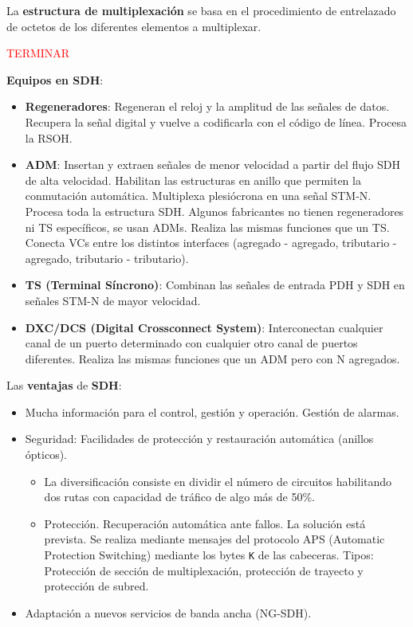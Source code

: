 \documentclass[10pt,portrait, twocolumn]{article}
\begin{document}
La \textbf{estructura de multiplexación} se basa en el procedimiento de entrelazado de octetos de los diferentes elementos a multiplexar.

\textcolor{red}{TERMINAR}

\textbf{Equipos en SDH}:

	\begin{itemize}
	\item \textbf{Regeneradores}: Regeneran el reloj y la amplitud de las señales de datos. Recupera la señal digital y vuelve a codificarla con el código de línea. Procesa la RSOH.
	\item \textbf{ADM}: Insertan y extraen señales de menor velocidad a partir del flujo SDH de alta velocidad. Habilitan las estructuras en anillo que permiten la conmutación automática. Multiplexa plesiócrona en una señal STM-N. Procesa toda la estructura SDH. Algunos fabricantes no tienen regeneradores ni TS específicos, se usan ADMs. Realiza las mismas funciones que un TS. Conecta VCs entre los distintos interfaces (agregado - agregado, tributario - agregado, tributario - tributario).
	\item \textbf{TS (Terminal Síncrono)}: Combinan las señales de entrada PDH y SDH en señales STM-N de mayor velocidad.
	\item \textbf{DXC/DCS (Digital Crossconnect System)}: Interconectan cualquier canal de un puerto determinado con cualquier otro canal de puertos diferentes. Realiza las mismas funciones que un ADM pero con N agregados. 
	\end{itemize}
	
Las \textbf{ventajas} de \textbf{SDH}:
	
		\begin{itemize}
		\item Mucha información para el control, gestión y operación. Gestión de alarmas.
		\item Seguridad: Facilidades de protección y restauración automática (anillos ópticos). 
			\begin{itemize}
			\item La diversificación consiste en dividir el número de circuitos habilitando dos rutas con capacidad de tráfico de algo más de 50\%.
			\item Protección. Recuperación automática ante fallos. La solución está prevista. Se realiza mediante mensajes del protocolo APS (Automatic Protection Switching) mediante los bytes \texttt{K} de las cabeceras. Tipos: Protección de sección de multiplexación, protección de trayecto y protección de subred.
			\end{itemize}
		\item Adaptación a nuevos servicios de banda ancha (NG-SDH).
		\end{itemize}
\end{document}
